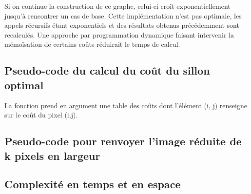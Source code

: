\documentclass[a4paper, 11pt, oneside]{article}
\begin{document}
\begin{center}
\end{center}

Si on continue la construction de ce graphe, celui-ci croît exponentiellement jusqu'à rencontrer un cas de base. Cette implémentation n'est pas optimale, les appels récursifs étant exponentiels et des résultats obtenus précédemment sont recalculés. Une approche par programmation dynamique faisant intervenir la mémoïsation de certains coûts réduirait le temps de calcul.

\subsection{Pseudo-code du calcul du coût du sillon optimal}

La fonction  prend en argument une table des coûts dont l'élément (i, j) renseigne sur le coût du pixel (i,j).

\begin{codebox} %
\end{codebox}

\subsection{Pseudo-code pour renvoyer l'image réduite de k pixels en largeur}

\subsection{Complexité en temps et en espace}
\end{document}

